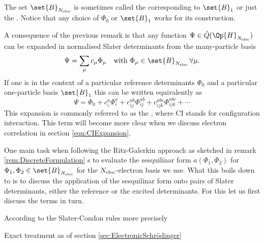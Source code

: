 The set $\set{B}_{\Nelec}$ is sometimes called the 
corresponding to $\set{B}_1$ or just the .
Notice that any choice of $\Phi_0$ or $\set{B}_1$ works for its construction.

\begin{rem}
	A consequence of the previous remark is that any
	function $\Psi \in \tilde{Q}(\Op{H}_{\Nelec})$
	can be expanded in normalised Slater determinants
	from the many-particle basis
	\begin{align}
		\label{eqn:ExpansionSlaterDeterminant}
		\Psi &= \sum_\mu c_\mu \Phi_\mu &\text{with } \Phi_\mu \in \set{B}_{\Nelec}\, \forall \mu.
	\end{align}
	If one is in the context of a particular reference determinants $\Phi_0$
	and a particular one-particle basis $\set{B}_1$ this can be written
	equivalently as
	\begin{equation}
		\label{eqn:CIExpansion}
		\Psi = \Phi_0 + c_i^a \Phi_i^a + c_{ij}^{ab} \Phi_{ij}^{ab} + c_{ijk}^{abc} \Phi_{ijk}^{abc}
		 + \cdots
	\end{equation}
	This expansion is commonly referred to as the ,
	where CI stands for configuration interaction.
	This term will become more clear when we discuss electron
	correlation in section \vref{eqn:CIExpansion}.
\end{rem}

One main task when following the Ritz-Galerkin approach
as sketched in remark \vref{rem:DiscreteFormulation}
s to evaluate the sesquilinar form
$a(\Phi_1, \Phi_2)$ for $\Phi_1, \Phi_2 \in \set{B}_{\Nelec}$
for the $N_\text{elec}$-electron basis we use.
What this boils down to is to discuss the  application of the sesquilinar form
onto pairs of Slater determinants,
either the reference or the excited determinants.
For this let us first discuss the terms in turn.

\begin{rem}


According to the Slater-Condon rules
more precisely

\end{rem}


\begin{rem}[Full-CI]
Exact treatment as of section \vref{sec:ElectronicSchrödinger}
\end{rem}
